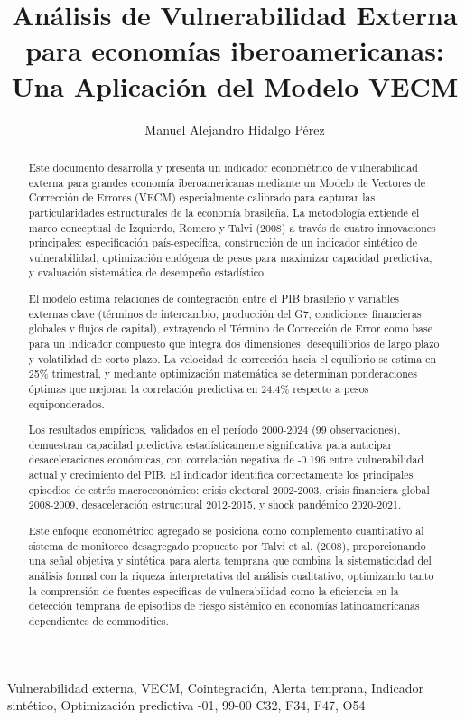 \documentclass[3p,11pt]{elsarticle}
\begin{document}
\begin{frontmatter}

\title{Análisis de Vulnerabilidad Externa para economías iberoamericanas: Una Aplicación del Modelo VECM}

\author[inst1]{Manuel Alejandro Hidalgo Pérez}
\address[inst1]{Departamento de Economía, Universidad Pablo de Olavide, Sevilla, España}

\begin{abstract}
Este documento desarrolla y presenta un indicador econométrico de vulnerabilidad externa para grandes economía iberoamericanas mediante un Modelo de Vectores de Corrección de Errores (VECM) especialmente calibrado para capturar las particularidades estructurales de la economía brasileña. La metodología extiende el marco conceptual de Izquierdo, Romero y Talvi (2008) a través de cuatro innovaciones principales: especificación país-específica, construcción de un indicador sintético de vulnerabilidad, optimización endógena de pesos para maximizar capacidad predictiva, y evaluación sistemática de desempeño estadístico.

El modelo estima relaciones de cointegración entre el PIB brasileño y variables externas clave (términos de intercambio, producción del G7, condiciones financieras globales y flujos de capital), extrayendo el Término de Corrección de Error como base para un indicador compuesto que integra dos dimensiones: desequilibrios de largo plazo y volatilidad de corto plazo. La velocidad de corrección hacia el equilibrio se estima en 25\% trimestral, y mediante optimización matemática se determinan ponderaciones óptimas que mejoran la correlación predictiva en 24.4\% respecto a pesos equiponderados.

Los resultados empíricos, validados en el período 2000-2024 (99 observaciones), demuestran capacidad predictiva estadísticamente significativa para anticipar desaceleraciones económicas, con correlación negativa de -0.196 entre vulnerabilidad actual y crecimiento del PIB. El indicador identifica correctamente los principales episodios de estrés macroeconómico: crisis electoral 2002-2003, crisis financiera global 2008-2009, desaceleración estructural 2012-2015, y shock pandémico 2020-2021.

Este enfoque econométrico agregado se posiciona como complemento cuantitativo al sistema de monitoreo desagregado propuesto por Talvi et al. (2008), proporcionando una señal objetiva y sintética para alerta temprana que combina la sistematicidad del análisis formal con la riqueza interpretativa del análisis cualitativo, optimizando tanto la comprensión de fuentes específicas de vulnerabilidad como la eficiencia en la detección temprana de episodios de riesgo sistémico en economías latinoamericanas dependientes de commodities.
\end{abstract}

\begin{keyword}
Vulnerabilidad externa, VECM, Cointegración, Alerta temprana, Indicador sintético, Optimización predictiva
-01, 99-00
\JEL  C32, F34, F47, O54
\end{keyword}

\end{frontmatter}
\end{document}
